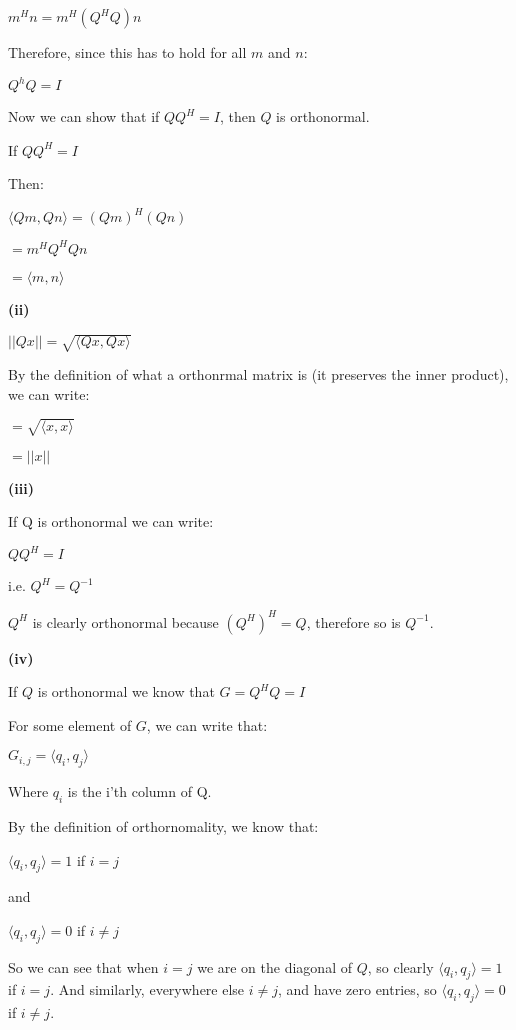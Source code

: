 \documentclass[letterpaper,12pt]{article}
\theoremstyle{definition}
\begin{document}
\begin{spacing}{1.3}{}
	$m^Hn = m^H(Q^HQ)n$
	
	Therefore, since this has to hold for all $m$ and $n$:
	
	$Q^hQ = I$
	
	Now we can show that if $QQ^H = I$, then $Q$ is orthonormal.
	
	If $QQ^H = I$
	
	Then:
	
	$\langle Qm, Qn \rangle = (Qm)^H(Qn)$
	
	$=m^HQ^HQn$
	
	$=\langle m, n \rangle$
	
	\setlength{\leftskip}{10pt}
	
	\textbf{(ii)}
	
	\setlength{\leftskip}{20pt}
	
	$||Qx|| = \sqrt{\langle Qx, Qx \rangle}$
	
	By the definition of what a orthonrmal matrix is (it preserves the inner product), we can write:
	
	$= \sqrt{\langle x, x \rangle}$
	
	
	$= ||x||$
	
	\setlength{\leftskip}{10pt}
	
	\textbf{(iii)}
	
	\setlength{\leftskip}{20pt}
	
	If Q is orthonormal we can write:
	
	$QQ^H = I$
	
	i.e. $Q^H = Q^{-1}$
	
	$Q^H$ is clearly orthonormal because $(Q^H)^H = Q$, therefore so is $Q^{-1}$.
	
	\setlength{\leftskip}{10pt}
	
	\textbf{(iv)}
	
	\setlength{\leftskip}{20pt}
	
	If $Q$ is orthonormal we know that $G =Q^HQ = I$
	
	For some element of $G$, we can write that:
	
	$G_{i, j} = \langle q_{i}, q_{j} \rangle$
	
	Where $q_{i}$ is the i'th column of Q.
	
	By the definition of orthornomality, we know that:
	
	$\langle q_{i}, q_{j} \rangle = 1$ if $i=j$
	
	and
	
	$\langle q_{i}, q_{j} \rangle = 0$ if $i \neq j$
	
	So we can see that when $i=j$ we are on the diagonal of $Q$, so clearly $\langle q_{i}, q_{j} \rangle = 1$ if $i=j$. And similarly, everywhere else $i \neq j$, and have zero entries, so $\langle q_{i}, q_{j} \rangle = 0$ if $i \neq j$.
	

\end{spacing}
\end{document}

